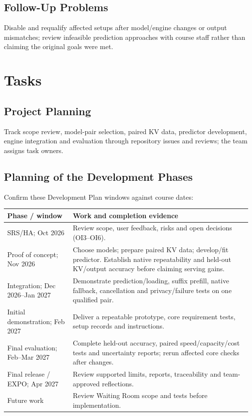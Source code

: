 \documentclass[12pt]{article}
\begin{document}
\subsection{Follow-Up Problems}
Disable and requalify affected setups after model/engine changes or output
mismatches; review infeasible prediction approaches with course staff rather
than claiming the original goals were met.


\section{Tasks}


\subsection{Project Planning}
Track scope review, model-pair selection, paired KV data, predictor development,
engine integration and evaluation through repository issues and reviews;
the team assigns task owners.


\subsection{Planning of the Development Phases}
\label{sec:phases}
Confirm these Development Plan windows against course dates:
\begin{longtable}{@{}p{}p{}@{}}
\toprule Phase / window & Work and completion evidence\\\midrule\endhead
SRS/HA; Oct 2026 & Review scope, user feedback, risks and open decisions (OI3--OI6).\\
Proof of concept; Nov 2026 & Choose models; prepare paired KV data; develop/fit predictor. Establish native repeatability and held-out KV/output accuracy before claiming serving gains.\\
Integration; Dec 2026--Jan 2027 & Demonstrate prediction/loading, suffix prefill, native fallback, cancellation and privacy/failure tests on one qualified pair.\\
Initial demonstration; Feb 2027 & Deliver a repeatable prototype, core requirement tests, setup records and instructions.\\
Final evaluation; Feb--Mar 2027 & Complete held-out accuracy, paired speed/capacity/cost tests and uncertainty reports; rerun affected core checks after changes.\\
Final release / EXPO; Apr 2027 & Review supported limits, reports, traceability and team-approved reflections.\\
Future work & Review Waiting Room scope and tests before implementation.\\
\bottomrule
\end{longtable}
\end{document}
